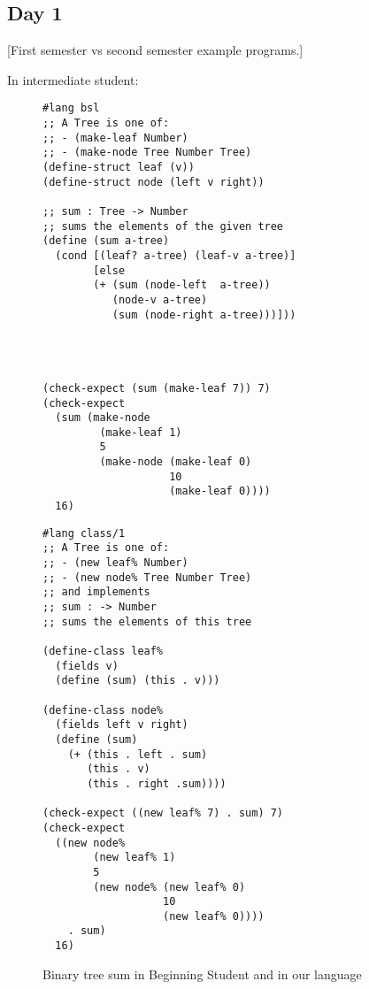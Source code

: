 \documentclass[submission,copyright]{eptcs}
\begin{document}

\subsection{Day 1}

[First semester vs second semester example programs.]

In intermediate student:

\begin{figure}[h!]
\begin{minipage}[t]{3.5in}
\begin{verbatim}
#lang bsl
;; A Tree is one of:
;; - (make-leaf Number)
;; - (make-node Tree Number Tree)
(define-struct leaf (v))
(define-struct node (left v right))

;; sum : Tree -> Number
;; sums the elements of the given tree
(define (sum a-tree)
  (cond [(leaf? a-tree) (leaf-v a-tree)]
        [else
        (+ (sum (node-left  a-tree))
           (node-v a-tree)
           (sum (node-right a-tree)))]))




(check-expect (sum (make-leaf 7)) 7)
(check-expect 
  (sum (make-node
         (make-leaf 1)
         5 
         (make-node (make-leaf 0)
                    10
                    (make-leaf 0))))
  16)
\end{verbatim}
\end{minipage}
\begin{minipage}[t]{3in}
\begin{verbatim}
#lang class/1
;; A Tree is one of:
;; - (new leaf% Number)
;; - (new node% Tree Number Tree)
;; and implements
;; sum : -> Number
;; sums the elements of this tree

(define-class leaf%
  (fields v)
  (define (sum) (this . v)))

(define-class node%
  (fields left v right)
  (define (sum)
    (+ (this . left . sum)
       (this . v)
       (this . right .sum))))

(check-expect ((new leaf% 7) . sum) 7)
(check-expect 
  ((new node%
        (new leaf% 1)
        5 
        (new node% (new leaf% 0) 
                   10
                   (new leaf% 0))))
    . sum)
  16)
\end{verbatim}
\end{minipage}
\caption{Binary tree sum in Beginning Student and in our language}
\end{figure}
\end{document}
